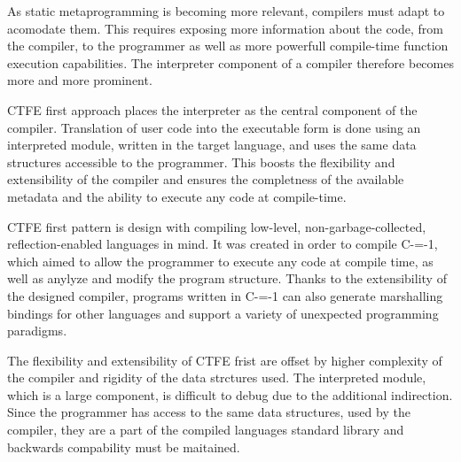 As static metaprogramming is becoming more relevant, compilers must adapt to acomodate them.
This requires exposing more information about the code, from the compiler, to the programmer as well as more powerfull compile-time function execution capabilities.
The interpreter component of a compiler therefore becomes more and more prominent.

CTFE first approach places the interpreter as the central component of the compiler.
Translation of user code into the executable form is done using an interpreted module, written in the target language, and uses the same data structures accessible to the programmer.
This boosts the flexibility and extensibility of the compiler and ensures the completness of the available metadata and the ability to execute any code at compile-time.

CTFE first pattern is design with compiling low-level, non-garbage-collected, reflection-enabled languages in mind.
It was created in order to compile C-=-1, which aimed to allow the programmer to execute any code at compile time, as well as anylyze and modify the program structure.
Thanks to the extensibility of the designed compiler, programs written in C-=-1 can also generate marshalling bindings for other languages and support a variety of unexpected programming paradigms.

The flexibility and extensibility of CTFE frist are offset by higher complexity of the compiler and rigidity of the data strctures used.
The interpreted module, which is a large component, is difficult to debug due to the additional indirection.
Since the programmer has access to the same data structures, used by the compiler, they are a part of the compiled languages standard library and backwards compability must be maitained.
